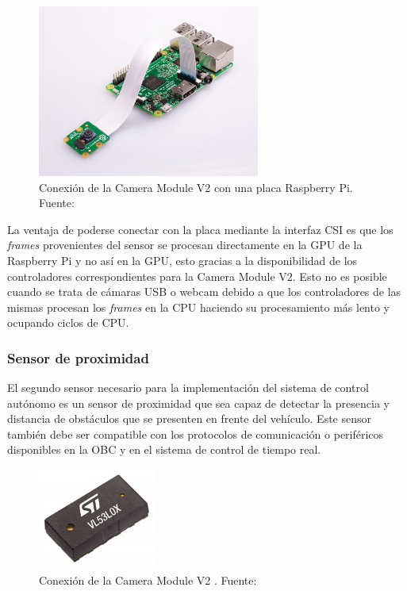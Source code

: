         \begin{figure}[!h] 
            \centering
            \includegraphics[width=0.65\textwidth]{img/raspicamconn}
            \caption[Conexión de la Camera Module V2]{Conexión de la Camera Module V2 con una placa Raspberry Pi. Fuente: \cite{raspicam} }
            \label{fig:raspicamconn}
        \end{figure}

        La ventaja de poderse conectar con la placa mediante la interfaz CSI es que los \textit{frames} provenientes del sensor 
        se procesan directamente en la GPU de la Raspberry Pi y no así en la GPU, esto gracias a la disponibilidad de los 
        controladores correspondientes para la Camera Module V2. Esto no es posible cuando se trata de cámaras USB o webcam 
        debido a que los controladores de las mismas procesan los \textit{frames} en la CPU haciendo su procesamiento más lento 
        y ocupando ciclos de CPU.

        \subsubsection{Sensor de proximidad}
        El segundo sensor necesario para la implementación del sistema de control autónomo es un sensor de proximidad que 
        sea capaz de detectar la presencia y distancia de obstáculos que se presenten en frente del vehículo. Este sensor 
        también debe ser compatible con los protocolos de comunicación o periféricos disponibles en la OBC y en el sistema 
        de control de tiempo real.

        \begin{figure}[!h] 
            \centering
            \includegraphics[width=0.35\textwidth]{img/laser}
            \caption[Sensor VL53L0X de ST Microelectronics]{Conexión de la Camera Module V2 . Fuente: \cite{laser} }
            \label{fig:laser}
        \end{figure}

